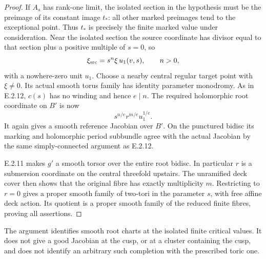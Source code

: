 \begin{proof}
If $A_s$ has rank-one limit, the isolated
section in the hypothesis must be the
preimage of its constant image $t_*$:
all other marked preimages tend to the
exceptional point.  Thus $t_*$ is precisely
the finite marked value under consideration.
Near the isolated section the source
coordinate has divisor equal to that section
plus a positive multiple of $s=0$, so
\[
 \xi_{\rm src}=s^n\xi\,u_1(v,s),\qquad n>0,
\]
with a nowhere-zero unit $u_1$.  Choose a
nearby central regular target point with
$\xi\ne0$.  Its actual smooth torus family
has identity parameter monodromy.  As in
E.2.12, $c(s)$ has no winding and hence
$e\mid n$.  The required holomorphic root
coordinate on $B'$ is now
\[
 s^{n/e}r^{m/e}u_1^{1/e}.
\]
It again gives a smooth reference Jacobian
over $B'$.  On the punctured bidisc its
marking and holomorphic period subbundle
agree with the actual Jacobian by the same
simply-connected argument as E.2.12.

E.2.11 makes $g'$ a smooth torsor over the
entire root bidisc.  In particular $r$ is
a submersion coordinate on the central
threefold upstairs.  The unramified deck
cover then shows that the original fibre
has exactly multiplicity $m$.  Restricting
to $r=0$ gives a proper smooth family of
two-tori in the parameter $s$, with free
affine deck action.  Its quotient is a
proper smooth family of the reduced finite
fibres, proving all assertions.
\end{proof}

\begin{remark}
The argument identifies smooth root charts
at the isolated finite critical values.
It does not give a good Jacobian at the
cusp, or at a cluster containing the cusp,
and does not identify an arbitrary such
completion with the prescribed toric one.
\end{remark}

